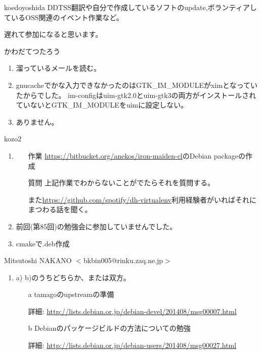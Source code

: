 \documentclass[mingoth,a4paper]{jsarticle}
\begin{document}
\begin{prework}{ koedoyoshida }
DDTSS翻訳や自分で作成しているソフトのupdate,ボランティアしているOSS関連のイベント作業など。

遅れて参加になると思います。
\end{prework}

\begin{prework}{ かわだてつたろう }
  \begin{enumerate}
  \item 溜っているメールを読む。
  \item gnucacheでかな入力できなかったのはGTK\_{}IM\_{}MODULEがximとなっていたからでした。
    im-configはuim-gtk2.0とuim-gtk3の両方がインストールされていないとGTK\_{}IM\_{}MODULEをuimに設定しない。
  \item ありません。
  \end{enumerate}
\end{prework}

\begin{prework}{ kozo2 }
  \begin{enumerate}
  \item
    \begin{itemize}
    \item [作業] \url{https://bitbucket.org/anekos/iron-maiden-cl}のDebian packageの作成
    \item [質問] 上記作業でわからないことがでたらそれを質問する。

      また\url{https://github.com/spotify/dh-virtualenv}利用経験者がいればそれにまつわる話を聞く。
    \end{itemize}
  \item 前回(第85回)の勉強会に参加していませんでした。
  \item cmakeで.deb作成
  \end{enumerate}
\end{prework}

\begin{prework}{ Mitsutoshi NAKANO $<$bkbin005@rinku.zaq.ne.jp$>$ }
  \begin{enumerate}
  \item a) b)のうちどちらか、または双方。
    \begin{itemize}
    \item [a] tamagoのupstreamの準備

      詳細: \url{http://lists.debian.or.jp/debian-devel/201408/msg00007.html}
    \item [b]Debianのパッケージビルドの方法についての勉強

      詳細: \url{http://lists.debian.or.jp/debian-users/201408/msg00027.html}
    \end{itemize}
  \end{enumerate}
\end{prework}
\end{document}
